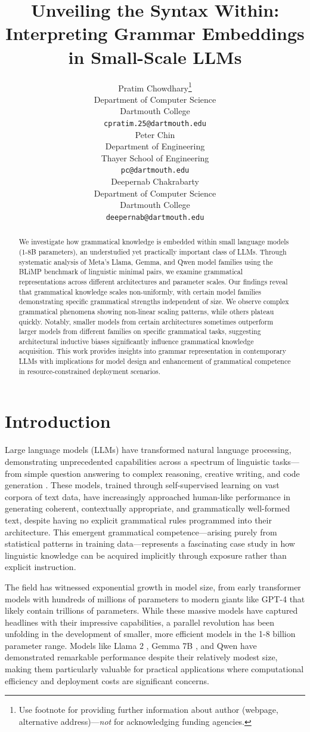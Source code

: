 \documentclass{article}
\title{Unveiling the Syntax Within: Interpreting Grammar Embeddings in Small-Scale LLMs}
\author{%
  Pratim Chowdhary\thanks{Use footnote for providing further information
    about author (webpage, alternative address)---\emph{not} for acknowledging
    funding agencies.} \\
  Department of Computer Science\\
  Dartmouth College\\
  \texttt{cpratim.25@dartmouth.edu} \\
  \And
  Peter Chin \\
  Department of Engineering\\
  Thayer School of Engineering\\
  \texttt{pc@dartmouth.edu} \\
  \And
  Deepernab Chakrabarty \\
  Department of Computer Science\\
  Dartmouth College\\
  \texttt{deepernab@dartmouth.edu} \\
}
\begin{document}
\maketitle

\begin{abstract}
  We investigate how grammatical knowledge is embedded within small language models (1-8B parameters), an understudied yet practically important class of LLMs. Through systematic analysis of Meta's Llama, Gemma, and Qwen model families using the BLiMP benchmark of linguistic minimal pairs, we examine grammatical representations across different architectures and parameter scales. Our findings reveal that grammatical knowledge scales non-uniformly, with certain model families demonstrating specific grammatical strengths independent of size. We observe complex grammatical phenomena showing non-linear scaling patterns, while others plateau quickly. Notably, smaller models from certain architectures sometimes outperform larger models from different families on specific grammatical tasks, suggesting architectural inductive biases significantly influence grammatical knowledge acquisition. This work provides insights into grammar representation in contemporary LLMs with implications for model design and enhancement of grammatical competence in resource-constrained deployment scenarios.
  \end{abstract}

\section{Introduction}
Large language models (LLMs) have transformed natural language processing, demonstrating unprecedented capabilities across a spectrum of linguistic tasks—from simple question answering to complex reasoning, creative writing, and code generation \citep{brown2020language, chowdhery2022palm, touvron2023llama2, jiang2023mistral}. These models, trained through self-supervised learning on vast corpora of text data, have increasingly approached human-like performance in generating coherent, contextually appropriate, and grammatically well-formed text, despite having no explicit grammatical rules programmed into their architecture. This emergent grammatical competence—arising purely from statistical patterns in training data—represents a fascinating case study in how linguistic knowledge can be acquired implicitly through exposure rather than explicit instruction.

The field has witnessed exponential growth in model size, from early transformer models with hundreds of millions of parameters \citep{vaswani2017attention} to modern giants like GPT-4 \citep{openai2023gpt4} that likely contain trillions of parameters. While these massive models have captured headlines with their impressive capabilities, a parallel revolution has been unfolding in the development of smaller, more efficient models in the 1-8 billion parameter range. Models like Llama 2 \citep{touvron2023llama2}, Gemma 7B \citep{jiang2023mistral}, and Qwen \citep{bai2023qwen} have demonstrated remarkable performance despite their relatively modest size, making them particularly valuable for practical applications where computational efficiency and deployment costs are significant concerns.
\end{document}
